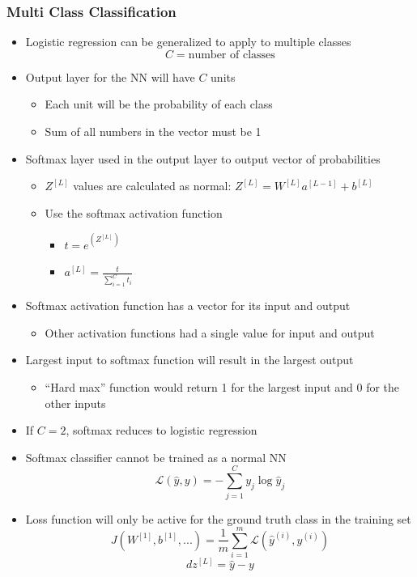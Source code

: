 \documentclass[12pt, letterpaper]{article}
\begin{document}
    \subsubsection{Multi Class Classification}
    \begin{itemize}
        \item Logistic regression can be generalized to apply to multiple classes
        $$C=\text{number of classes}$$
        \item Output layer for the NN will have $C$ units
        \begin{itemize}
            \item Each unit will be the probability of each class
            \item Sum of all numbers in the vector must be 1
        \end{itemize}
        \item Softmax layer used in the output layer to output vector of probabilities
        \begin{itemize}
            \item $Z^{[L]}$ values are calculated as normal: $Z^{[L]}=W^{[L]}a^{[L-1]}+b^{[L]}$
            \item Use the softmax activation function
            \begin{itemize}
                \item[] $t=e^{(Z^{[L]})}$
                \item[] $a^{[L]}=\frac{t}{\sum_{i=1}^Ct _i}$
            \end{itemize}
        \end{itemize}
        \item Softmax activation function has a vector for its input and output
        \begin{itemize}
            \item Other activation functions had a single value for input and output
        \end{itemize}
        \item Largest input to softmax function will result in the largest output
        \begin{itemize}
            \item ``Hard max'' function would return 1 for the largest input and 0 for the other inputs
        \end{itemize}
        \item If $C=2$, softmax reduces to logistic regression
        \item Softmax classifier cannot be trained as a normal NN
        $$\mathcal{L}(\hat{y},y)=-\sum_{j=1}^Cy_j\log\hat{y}_j$$
        \item Loss function will only be active for the ground truth class in the training set
        $$J(W^{[1]}, b^{[1]},...)=\frac{1}{m}\sum_{i=1}^m\mathcal{L}(\hat{y}^{(i)},y^{(i)})$$
        $$dz^{[L]}=\hat{y}-y$$
    \end{itemize}
\end{document}
